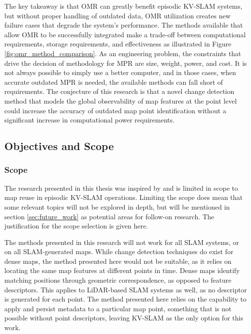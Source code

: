 The key takeaway is that OMR can greatly benefit episodic KV-SLAM systems, but without proper handling of outdated data, OMR utilization creates new failure cases that degrade the system's performance. The methods available that allow OMR to be successfully integrated make a trade-off between computational requirements, storage requirements, and effectiveness as illustrated in Figure \ref{fig:omr_method_comparison}. As an engineering problem, the constraints that drive the decision of methodology for MPR are size, weight, power, and cost. It is not always possible to simply use a better computer, and in those cases, when accurate outdated MPR is needed, the available methods can fall short of requirements. The conjecture of this research is that a novel change detection method that models the global observability of map features at the point level could increase the accuracy of outdated map point identification without a significant increase in computational power requirements.

\subsection{Objectives and Scope}
\label{sec:objectives}

\subsubsection*{Scope}

The research presented in this thesis was inspired by and is limited in scope to map reuse in episodic KV-SLAM operations. Limiting the scope does mean that some relevant topics will not be explored in depth, but will be mentioned in section \ref{sec:future_work} as potential areas for follow-on research. The justification for the scope selection is given here.

The methods presented in this research will not work for all SLAM systems, or on all SLAM-generated maps. While change detection techniques do exist for dense maps, the method presented here would not be suitable, as it relies on locating the same map features at different points in time. Dense maps identify matching positions through geometric correspondence, as opposed to feature descriptors. This applies to LiDAR-based SLAM systems as well, as no descriptor is generated for each point. The method presented here relies on the capability to apply and persist metadata to a particular map point, something that is not possible without point descriptors, leaving KV-SLAM as the only option for this work.

